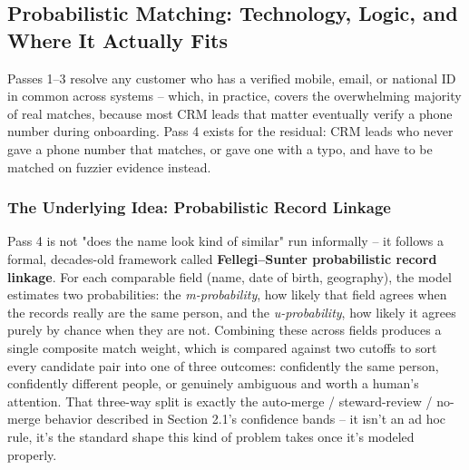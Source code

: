 \documentclass[11pt]{article}
\begin{document}
\subsection{Probabilistic Matching: Technology, Logic, and Where It Actually Fits}
Passes 1--3 resolve any customer who has a verified mobile, email, or national ID in common across systems -- which, in practice, covers the overwhelming majority of real matches, because most CRM leads that matter eventually verify a phone number during onboarding. Pass 4 exists for the residual: CRM leads who never gave a phone number that matches, or gave one with a typo, and have to be matched on fuzzier evidence instead.

\subsubsection*{The Underlying Idea: Probabilistic Record Linkage}
Pass 4 is not "does the name look kind of similar" run informally -- it follows a formal, decades-old framework called \textbf{Fellegi--Sunter probabilistic record linkage}. For each comparable field (name, date of birth, geography), the model estimates two probabilities: the \emph{m-probability}, how likely that field agrees when the records really are the same person, and the \emph{u-probability}, how likely it agrees purely by chance when they are not. Combining these across fields produces a single composite match weight, which is compared against two cutoffs to sort every candidate pair into one of three outcomes: confidently the same person, confidently different people, or genuinely ambiguous and worth a human's attention. That three-way split is exactly the auto-merge / steward-review / no-merge behavior described in Section 2.1's confidence bands -- it isn't an ad hoc rule, it's the standard shape this kind of problem takes once it's modeled properly.
\end{document}
